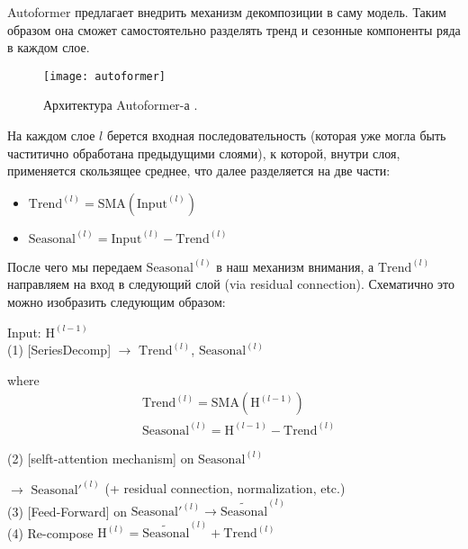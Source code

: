 Autoformer предлагает внедрить механизм декомпозиции 
в саму модель. Таким образом она сможет самостоятельно 
разделять тренд и сезонные компоненты ряда в каждом слое.

\begin{figure}[h!]
    \centering
    \texttt{[image: autoformer]}
    \caption{Архитектура Autoformer-а \cite{autoformer}.}
    \label{fig:autoformer}
\end{figure}

\newpage

На каждом слое $l$ берется входная последовательность 
(которая уже могла быть частитично обработана предыдущими слоями), 
к которой, внутри слоя, применяется скользящее среднее, что далее 
разделяется на две части:
\begin{itemize}
    \item $\text{Trend}^{(l)} = \text{SMA}(\text{Input}^{(l)})$
    \item $\text{Seasonal}^{(l)} = \text{Input}^{(l)} - \text{Trend}^{(l)}$
\end{itemize}

После чего мы передаем $\text{Seasonal}^{(l)}$ в наш механизм 
внимания, а $\text{Trend}^{(l)}$ направляем на вход в следующий слой 
(via residual connection). Схематично это можно изобразить 
следующим образом:

\begin{framed}
    \noindent Input: $\text{H}^{(l-1)}$ \\
    
    \noindent (1) [SeriesDecomp] $\rightarrow$ $\text{Trend}^{(l)}$, $\text{Seasonal}^{(l)}$ 
    
    \qquad where \vspace{-40pt} \begin{align*}
        & \text{Trend}^{(l)} = \text{SMA}(\text{H}^{(l-1)}) \\ 
        & \text{Seasonal}^{(l)} = \text{H}^{(l-1)} - \text{Trend}^{(l)} 
    \end{align*}

    \noindent (2) [selft-attention mechanism] on $\text{Seasonal}^{(l)}$

    \qquad $\rightarrow$ $\text{Seasonal}'^{(l)}$ (+ residual connection, normalization, etc.) \\ 

    \noindent (3) [Feed-Forward] on $\text{Seasonal}'^{(l)} \rightarrow \widetilde{\text{Seasonal}}^{(l)}$ \\
    
    \noindent (4) Re-compose $\text{H}^{(l)} = \widetilde{\text{Seasonal}}^{(l)} + \text{Trend}^{(l)}$
\end{framed}

